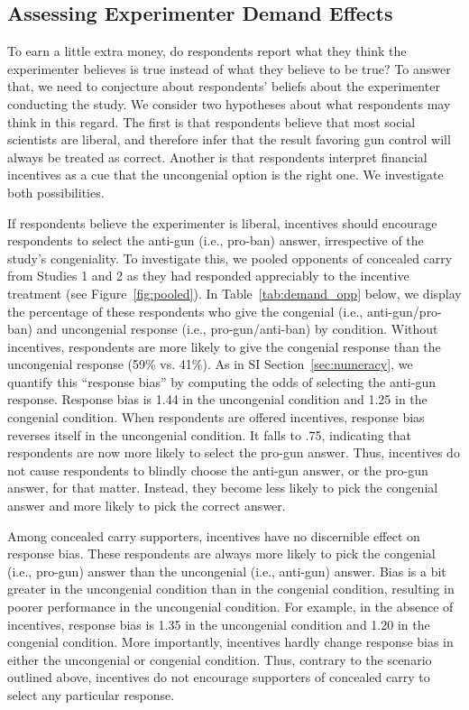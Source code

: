 \documentclass[12pt, letterpaper]{article}
\begin{document}
\clearpage
\subsection{Assessing Experimenter Demand Effects}
\label{sec:demand}

To earn a little extra money, do respondents report what they think the experimenter believes is true instead of what they believe to be true? To answer that, we need to conjecture about respondents' beliefs about the experimenter conducting the study. We consider two hypotheses about what respondents may think in this regard. The first is that respondents believe that most social scientists are liberal, and therefore infer that the result favoring gun control will always be treated as correct. Another is that respondents interpret financial incentives as a cue that the uncongenial option is the right one. We investigate both possibilities.

If respondents believe the experimenter is liberal, incentives should encourage respondents to select the anti-gun (i.e., pro-ban) answer, irrespective of the study's congeniality. To investigate this, we pooled opponents of concealed carry from Studies 1 and 2 as they had responded appreciably to the incentive treatment (see Figure~\ref{fig:pooled}). In Table~\ref{tab:demand_opp} below, we display the percentage of these respondents who give the congenial (i.e., anti-gun/pro-ban) and uncongenial response (i.e., pro-gun/anti-ban) by condition. Without incentives, respondents are more likely to give the congenial response than the uncongenial response (59\% vs. 41\%). As in SI Section~\ref{sec:numeracy}, we quantify this ``response bias'' by computing the odds of selecting the anti-gun response. Response bias is 1.44 in the uncongenial condition and 1.25 in the congenial condition. When respondents are offered incentives, response bias reverses itself in the uncongenial condition. It falls to .75, indicating that respondents are now more likely to select the pro-gun answer. Thus, incentives do not cause respondents to blindly choose the anti-gun answer, or the pro-gun answer, for that matter. Instead, they become less likely to pick the congenial answer and more likely to pick the correct answer.

Among concealed carry supporters, incentives have no discernible effect on response bias. These respondents are always more likely to pick the congenial (i.e., pro-gun) answer than the uncongenial  (i.e., anti-gun) answer. Bias is a bit greater in the uncongenial condition than in the congenial condition, resulting in poorer performance in the uncongenial condition. For example, in the absence of incentives, response bias is 1.35 in the uncongenial condition and 1.20 in the congenial condition. More importantly, incentives hardly change response bias in either the uncongenial or congenial condition. Thus, contrary to the scenario outlined above, incentives do not encourage supporters of concealed carry to select any particular response.
\end{document}
